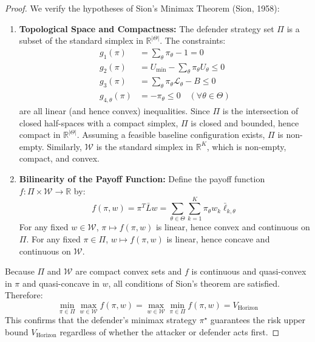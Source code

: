 \begin{proof}
We verify the hypotheses of Sion's Minimax Theorem (Sion, 1958):
\begin{enumerate}
    \item \textbf{Topological Space and Compactness:} The defender strategy set $\Pi$ is a subset of the standard simplex in $\mathbb{R}^{|\Theta|}$. The constraints:
    \begin{align}
        g_1(\pi) &= \sum_{\theta} \pi_\theta - 1 = 0 \\
        g_2(\pi) &= U_{\min} - \sum_{\theta} \pi_\theta U_\theta \le 0 \\
        g_3(\pi) &= \sum_{\theta} \pi_\theta \mathcal{L}_\theta - B \le 0 \\
        g_{4,\theta}(\pi) &= -\pi_\theta \le 0 \quad (\forall \theta \in \Theta)
    \end{align}
    are all linear (and hence convex) inequalities. Since $\Pi$ is the intersection of closed half-spaces with a compact simplex, $\Pi$ is closed and bounded, hence compact in $\mathbb{R}^{|\Theta|}$. Assuming a feasible baseline configuration exists, $\Pi$ is non-empty.
    Similarly, $\mathcal{W}$ is the standard simplex in $\mathbb{R}^K$, which is non-empty, compact, and convex.
    \item \textbf{Bilinearity of the Payoff Function:} Define the payoff function $f: \Pi \times \mathcal{W} \to \mathbb{R}$ by:
    \begin{equation}
        f(\pi, w) = \pi^T \bar{L} w = \sum_{\theta \in \Theta} \sum_{k=1}^K \pi_\theta w_k \bar{\ell}_{k, \theta}
    \end{equation}
    For any fixed $w \in \mathcal{W}$, $\pi \mapsto f(\pi, w)$ is linear, hence convex and continuous on $\Pi$.
    For any fixed $\pi \in \Pi$, $w \mapsto f(\pi, w)$ is linear, hence concave and continuous on $\mathcal{W}$.
\end{enumerate}
Because $\Pi$ and $\mathcal{W}$ are compact convex sets and $f$ is continuous and quasi-convex in $\pi$ and quasi-concave in $w$, all conditions of Sion's theorem are satisfied.
Therefore:
\begin{equation}
    \min_{\pi \in \Pi} \max_{w \in \mathcal{W}} f(\pi, w) = \max_{w \in \mathcal{W}} \min_{\pi \in \Pi} f(\pi, w) = V_{\mathrm{Horizon}}
\end{equation}
This confirms that the defender's minimax strategy $\pi^\star$ guarantees the risk upper bound $V_{\mathrm{Horizon}}$ regardless of whether the attacker or defender acts first.
\end{proof}

